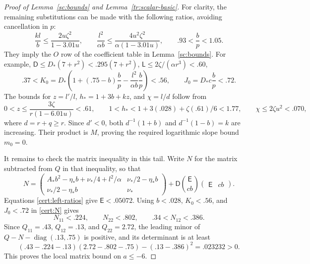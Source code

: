 \begin{proof}[Proof of Lemma~\ref{sc:bounds} and Lemma~\ref{tr:scalar-basic}]
For clarity, the remaining substitutions can be made with the following
ratios, avoiding cancellation in $p$:
\begin{equation}\label{cert:left-ratios}
 \frac{kl}{b}\le\frac{2u\zeta^2}{1-3.01u},\qquad
 \frac{l^2}{\alpha b}\le\frac{4u^2\zeta^2}{\alpha(1-3.01u)},
 \qquad .93<\frac bp<1.05.
\end{equation}
They imply the $O$ row of the coefficient table in Lemma~\ref{sc:bounds}.
For example, $\mathsf D\le D_*(7+r^2)<.295(7+r^2)$,
$\mathsf L\le2\zeta/(\alpha r^3)<.60$,
\[
 .37<K_0=D_*\left(1+( .75-b)\frac bp-
              \frac{l^2}{\alpha b}\frac bp\right)<.56,
 \qquad J_0=D_*c\frac bp<.72.
\]
The bounds for $z=l'/l$, $h_*=1+3b+kz$, and $\chi=l/d$ follow from
\[
 0<z\le\frac{3\zeta}{r(1-6.01u)}<.61,\qquad
 1<h_*<1+3(.028)+\zeta(.61)/6<1.77,
 \qquad \chi\le2\zeta u^2<.070,
\]
where $d=r+q\ge r$. Since $d'<0$, both $d^{-1}(1+b)$ and
$d^{-1}(1-b)=k$ are increasing. Their product is $M$, proving the
required logarithmic slope bound $m_0=0$.

It remains to check the matrix inequality in this tail. Write $N$ for the
matrix subtracted from $Q$ in that inequality, so that
\begin{equation}\label{cert:N}
 N=\begin{pmatrix}
 A_*b^2-\eta_*b+\nu_*/4+l^2/\alpha&\nu_*/2-\eta_*b\\
 \nu_*/2-\eta_*b&\nu_*
 \end{pmatrix}
 +\mathsf D\binom{\mathsf E}{cb}
                  \begin{pmatrix}\mathsf E&cb\end{pmatrix}.
\end{equation}
Equations \eqref{cert:left-ratios} give $\mathsf E<.05072$.
Using $b<.028$, $K_0<.56$, and $J_0<.72$ in \eqref{cert:N} gives
\[
 N_{11}<.224,\qquad N_{22}<.802,\qquad .34<N_{12}<.386.
\]
Since $Q_{11}=.43$, $Q_{12}=.13$, and $Q_{22}=2.72$, the leading
minor of $Q-N-\operatorname{diag}(.13,.75)$ is positive, and its
determinant is at least
\[
 (.43-.224-.13)(2.72-.802-.75)-(.13-.386)^2
 =.023232>0.
\]
This proves the local matrix bound on $a\le-6$.


\end{proof}
